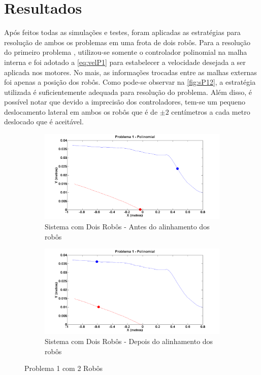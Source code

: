 \chapter{Resultados }
\label{chap:resultados}

Após feitos todas as simulações e testes, foram aplicadas as estratégias para resolução de ambos os problemas em uma frota de dois robôs. Para a resolução do primeiro problema , utilizou-se somente o controlador polinomial na malha interna e foi adotado a \autoref{eq:velP1} para estabelecer a velocidade desejada a ser aplicada nos motores. No mais, as informações trocadas entre as malhas externas foi apenas a posição dos robôs. Como pode-se observar na \autoref{fig:sP12}, a estratégia utilizada é suficientemente adequada para resolução do problema. Além disso, é possível notar que devido a imprecisão dos controladores, tem-se um pequeno deslocamento lateral em ambos os robôs que é de $\pm 2$ centímetros a cada metro deslocado que é aceitável.

\begin{figure}[!htb]
	\centering
	\begin{subfigure}{1.0\textwidth}
		\centering
		\includegraphics[width=.9\linewidth]{./Testes/Problema1/Incremental/P1Antes}
		\caption{Sistema com Dois Robôs - Antes do alinhamento dos robôs}
		\label{fig:P12Ini}
	\end{subfigure}
	\begin{subfigure}{1.0\textwidth}
		\centering
		\includegraphics[width=.9\linewidth]{./Testes/Problema1/Incremental/P1Depois}
		\caption{Sistema com Dois Robôs - Depois do alinhamento dos robôs}
		\label{fig:P12Fim}
	\end{subfigure}
	\caption{Problema 1 com 2 Robôs}
	\label{fig:sP12}
\end{figure}

